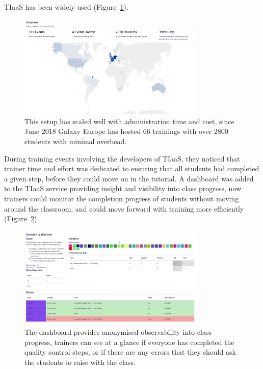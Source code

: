 \documentclass[10pt,letterpaper]{article}
\begin{document}
TIaaS has been widely used (Figure~\ref{fig:tiaas-map}).

\begin{figure}[!ht]
	\centering
	\includegraphics[width=0.8\textwidth]{images/tiaas-map.png}
	\caption{This setup has scaled well with administration time and cost, since June 2018 Galaxy Europe has hosted 66 trainings with over 2800 students with minimal overhead.\label{fig:tiaas-map}}
\end{figure}


During training events involving the developers of TIaaS, they noticed that trainer time and effort was dedicated to ensuring that all students had completed a given step, before they could move on in the tutorial.
A dashboard was added to the TIaaS service providing insight and visibility into class progress, now trainers could monitor the completion progress of students without moving around the classroom, and could move forward with training more efficiently (Figure~\ref{fig:tiaas}).


\begin{figure}[!ht]
	\centering
	\includegraphics[width=0.8\textwidth]{images/tiaas.png}
	\caption{The dashboard provides anonymised observability into class progress, trainers can see at a glance if everyone has completed the quality control steps, or if there are any errors that they should ask the students to raise with the class.\label{fig:tiaas}}
\end{figure}
\end{document}
